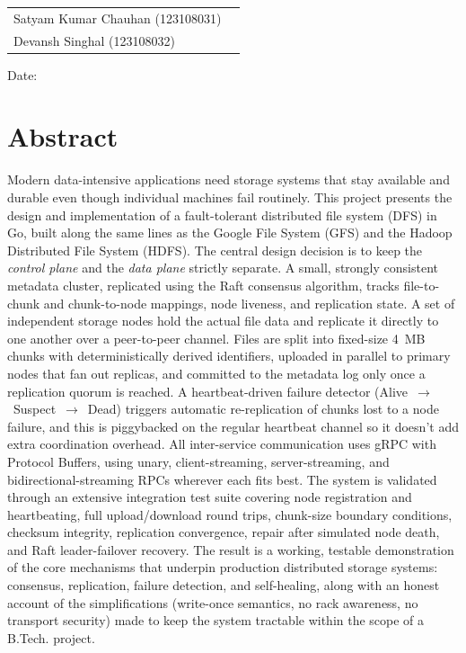 \documentclass[12pt,a4paper]{report}
\begin{document}
\begin{tabular}{ll}
    Satyam Kumar Chauhan (123108031) & \underline{\hspace{4cm}} \\[6pt]
    Devansh Singhal (123108032) & \underline{\hspace{4cm}} \\
\end{tabular}

\vspace{1cm}
Date: \underline{\hspace{4cm}}

\chapter*{Abstract}

Modern data-intensive applications need storage systems that stay available and durable even though individual machines fail routinely. This project presents the design and implementation of a fault-tolerant distributed file system (DFS) in Go, built along the same lines as the Google File System (GFS) and the Hadoop Distributed File System (HDFS). The central design decision is to keep the \emph{control plane} and the \emph{data plane} strictly separate. A small, strongly consistent metadata cluster, replicated using the Raft consensus algorithm, tracks file-to-chunk and chunk-to-node mappings, node liveness, and replication state. A set of independent storage nodes hold the actual file data and replicate it directly to one another over a peer-to-peer channel. Files are split into fixed-size 4~MB chunks with deterministically derived identifiers, uploaded in parallel to primary nodes that fan out replicas, and committed to the metadata log only once a replication quorum is reached. A heartbeat-driven failure detector (Alive~$\rightarrow$~Suspect~$\rightarrow$~Dead) triggers automatic re-replication of chunks lost to a node failure, and this is piggybacked on the regular heartbeat channel so it doesn't add extra coordination overhead. All inter-service communication uses gRPC with Protocol Buffers, using unary, client-streaming, server-streaming, and bidirectional-streaming RPCs wherever each fits best. The system is validated through an extensive integration test suite covering node registration and heartbeating, full upload/download round trips, chunk-size boundary conditions, checksum integrity, replication convergence, repair after simulated node death, and Raft leader-failover recovery. The result is a working, testable demonstration of the core mechanisms that underpin production distributed storage systems: consensus, replication, failure detection, and self-healing, along with an honest account of the simplifications (write-once semantics, no rack awareness, no transport security) made to keep the system tractable within the scope of a B.Tech. project.
\end{document}
